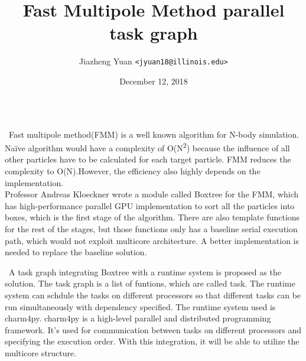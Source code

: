 \documentclass[final,t]{beamer}
\title{Fast Multipole Method parallel task graph}
\author{Jiazheng Yuan \texttt{<jyuan18@illinois.edu>}}
\institute{%
  Computer Science
  $\cdot$ University of Illinois
}
\date{December 12, 2018}
\begin{document}
\begin{frame}[fragile]{}
  \begin{columns}[t]


    \begin{column}{.45\linewidth}
      \begin{tcolorbox}[toplevelbox,adjusted title={Problem Statement}]
        \ Fast multipole method(FMM) is a well known algorithm for N-body simulation. Naïve algorithm would have a complexity of O(N\textsuperscript{2}) because the influence of all other particles have to be calculated for each target particle. FMM reduces the complexity to O(N).However, the efficiency also highly depends on the implementation. 
        \\  Professor Andreas Kloeckner wrote a module called Boxtree for the FMM, which has high-performance parallel GPU implementation to sort all the particles into boxes, which is the first stage of the algorithm. There are also template functions for the rest of the stages, but those functions only has a baseline serial execution path, which would not exploit multicore architecture. A better implementation is needed to replace the baseline solution.
        
      \end{tcolorbox}

      \begin{tcolorbox}[toplevelbox,adjusted title=Approach]
        \ A task graph integrating Boxtree with a runtime system is proposed as the 
          solution. The task graph is a list of funtions, which are called task. The runtime system can schdule the tasks on different processors so that different tasks can be run simultaneously with dependency specified. The runtime system
          used is charm4py. charm4py is a high-level parallel and distributed programming framework. It's used for communication between tasks on different
          processors and specifying the execution order. With this integration, it will be able to utilize the multicore structure.
      \end{tcolorbox}


\end{column}
\end{columns}
\end{frame}
\end{document}
